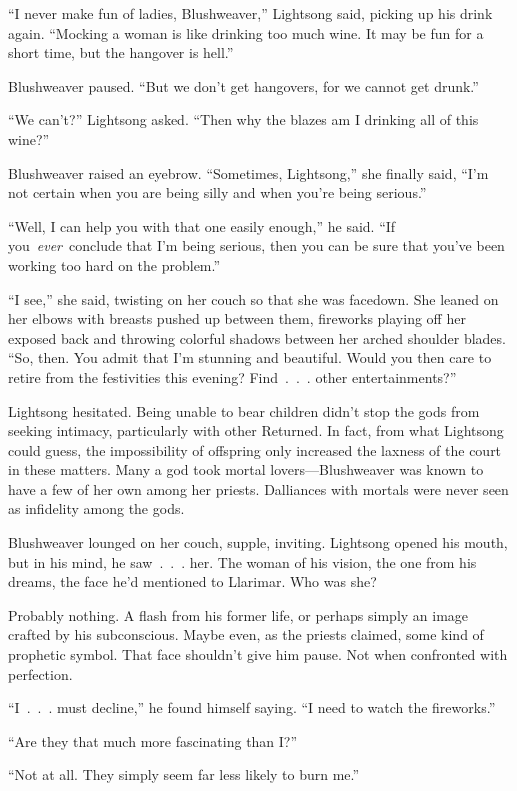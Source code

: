 “I never make fun of ladies, Blushweaver,” Lightsong said, picking up his drink again. “Mocking a woman is like drinking too much wine. It may be fun for a short time, but the hangover is hell.”

Blushweaver paused. “But we don’t get hangovers, for we cannot get drunk.”

“We can’t?” Lightsong asked. “Then why the blazes am I drinking all of this wine?”

Blushweaver raised an eyebrow. “Sometimes, Lightsong,” she finally said, “I’m not certain when you are being silly and when you’re being serious.”

“Well, I can help you with that one easily enough,” he said. “If you~\textit{ever}~conclude that I’m being serious, then you can be sure that you’ve been working too hard on the problem.”

“I see,” she said, twisting on her couch so that she was facedown. She leaned on her elbows with breasts pushed up between them, fireworks playing off her exposed back and throwing colorful shadows between her arched shoulder blades. “So, then. You admit that I’m stunning and beautiful. Would you then care to retire from the festivities this evening? Find~.~.~. other entertainments?”

Lightsong hesitated. Being unable to bear children didn’t stop the gods from seeking intimacy, particularly with other Returned. In fact, from what Lightsong could guess, the impossibility of offspring only increased the laxness of the court in these matters. Many a god took mortal lovers—Blushweaver was known to have a few of her own among her priests. Dalliances with mortals were never seen as infidelity among the gods.

Blushweaver lounged on her couch, supple, inviting. Lightsong opened his mouth, but in his mind, he saw~.~.~. her. The woman of his vision, the one from his dreams, the face he’d mentioned to Llarimar. Who was she?

Probably nothing. A flash from his former life, or perhaps simply an image crafted by his subconscious. Maybe even, as the priests claimed, some kind of prophetic symbol. That face shouldn’t give him pause. Not when confronted with perfection.

“I~.~.~. must decline,” he found himself saying. “I need to watch the fireworks.”

“Are they that much more fascinating than I?”

“Not at all. They simply seem far less likely to burn me.”

